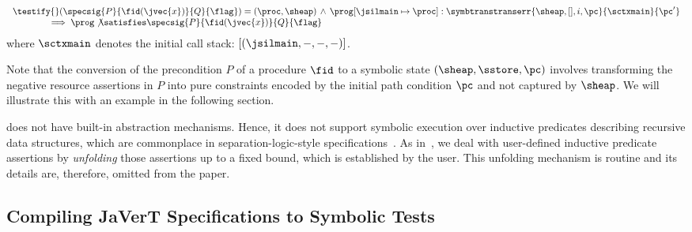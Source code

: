 \begin{theorem}\label{teo:bug:finding:sl}
$$
\begin{array}{l}
\testify{}(\specsig{P}{\fid(\jvec{x})}{Q}{\flag})  = (\proc, \sheap) \, \wedge \, 
   \prog[\jsilmain \mapsto \proc] : \symbtranstranserr{\sheap, [], i, \pc}{\sctxmain}{\pc'} \\
  \qquad \qquad \implies
        \prog \not\satisfies \specsig{P}{\fid(\jvec{x})}{Q}{\flag}
\end{array}
$$
\noindent where $\sctxmain$ denotes the initial call stack: $[ (\jsilmain, -, -, -) ]$.
\end{theorem}


Note that the conversion of the 
precondition $P$ of a \jsil procedure $\fid$ to a symbolic state $(\sheap, \sstore, \pc)$ involves transforming the negative resource assertions in $P$ into pure constraints encoded by the initial path condition $\pc$ and not captured by $\sheap$.
We will illustrate this with an example in the following section. 

\cosette does not have built-in abstraction mechanisms. Hence, it does not support symbolic
execution over inductive predicates describing recursive data structures, which are 
commonplace in separation-logic-style specifications~\cite{smallf, berdine:aplas:2005}. 
As in~\cite{korat}, we deal with user-defined inductive predicate assertions by \emph{unfolding} 
those assertions up to a fixed bound, which is established by the user. This unfolding mechanism 
is routine
and its details are, therefore, omitted from the paper. 


\subsection{Compiling JaVerT Specifications to Symbolic Tests} 
\label{specs:example}

